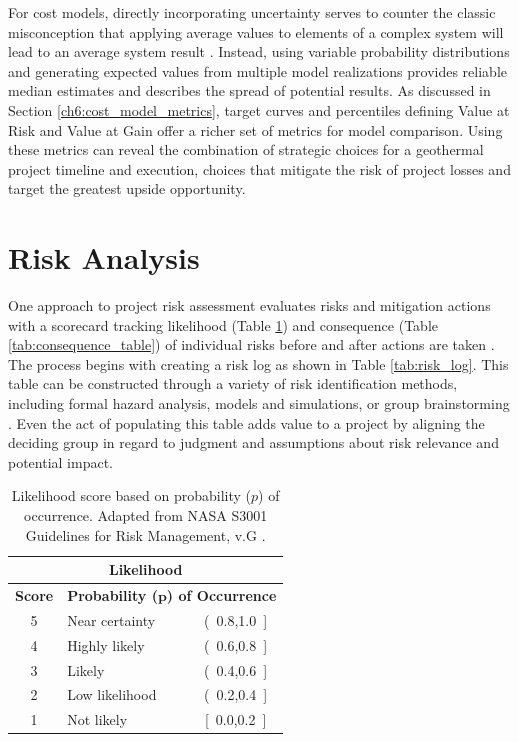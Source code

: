 For cost models, directly incorporating uncertainty serves to counter the classic misconception that applying average values to elements of a complex system will lead to an average system result \citep[Flaw of Averages,][p.\ 17--19]{de_neufville_flexibility_2011}. Instead, using variable probability distributions and generating expected values from multiple model realizations provides reliable median estimates and describes the spread of potential results. As discussed in Section \ref{ch6:cost_model_metrics}, target curves and percentiles defining Value at Risk and Value at Gain offer a richer set of metrics for model comparison. Using these metrics can reveal the combination of strategic choices for a geothermal project timeline and execution, choices that mitigate the risk of project losses and target the greatest upside opportunity.

\section{Risk Analysis}\label{ch7:risk_analysis}

One approach to project risk assessment evaluates risks and mitigation actions with a scorecard tracking likelihood (Table \ref{tab:likelihood_table}) and consequence (Table \ref{tab:consequence_table}) of individual risks before and after actions are taken \citep{malone_development_2004}. The process begins with creating a risk log as shown in Table \ref{tab:risk_log}. This table can be constructed through a variety of risk identification methods, including formal hazard analysis, models and simulations, or group brainstorming \citep{nasa_s3001_2017}. Even the act of populating this table adds value to a project by aligning the deciding group in regard to judgment and assumptions about risk relevance and potential impact.

\begin{table}[!htp]
\centering
\begin{tabular}{|c|l|c|}
\hline
\multicolumn{3}{|c|}{\textbf{Likelihood}} \\ \hline
\textbf{Score} & \multicolumn{2}{c|}{\textbf{Probability ($\boldsymbol p$) of Occurrence}} \\ \hline
5 & Near certainty & (\ 0.8,1.0\ {]} \\ \hline
4 & Highly likely & (\ 0.6,0.8\ {]} \\ \hline
3 & Likely & (\ 0.4,0.6\ {]} \\ \hline
2 & Low likelihood & (\ 0.2,0.4\ {]} \\ \hline
1 & Not likely & {[}\ 0.0,0.2\ {]} \\ \hline
\end{tabular}
\caption[Risk likelihood]{Likelihood score based on probability ($p$) of occurrence. Adapted from NASA S3001 Guidelines for Risk Management, v.G \protect\citep{malone_development_2004}.}
\label{tab:likelihood_table}
\end{table}

